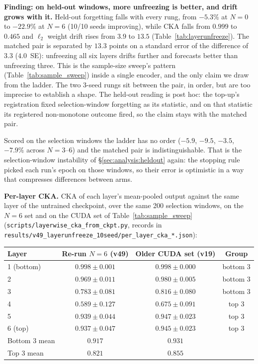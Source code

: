 

\textbf{Finding: on held-out windows, more unfreezing is better, and drift grows
with it.}  Held-out forgetting falls with every rung, from $-5.3\%$ at $N{=}0$ to
$-22.9\%$ at $N{=}6$ (10/10 seeds improving), while CKA falls from $0.999$ to
$0.465$ and $\ell_2$ weight drift rises from $3.9$ to $13.5$
(Table~\ref{tab:layerunfreeze}).  The matched pair is separated by $13.3$ points
on a standard error of the difference of $3.3$ ($4.0$~SE): unfreezing all six
layers drifts further and forecasts better than unfreezing three.  This is the
sample-size sweep's pattern (Table~\ref{tab:sample_sweep}) inside a single
encoder, and the only claim we draw from the ladder.  The two 3-seed rungs sit
between the pair, in order, but are too imprecise to establish a shape.  The
held-out reading is post hoc: the top-up's registration fixed selection-window
forgetting as its statistic, and on that statistic its registered non-monotone
outcome fired, so the claim stays with the matched pair.

Scored on the selection windows the ladder has no order ($-5.9$, $-9.5$, $-3.5$,
$-7.9\%$ across $N{=}3$--$6$) and the matched pair is indistinguishable.  That is
the selection-window instability of \S\ref{sec:analysis:heldout} again: the
stopping rule picked each run's epoch on those windows, so their error is
optimistic in a way that compresses differences between arms.

\textbf{Per-layer CKA.}  CKA of each layer's mean-pooled output against the same
layer of the untrained checkpoint, over the same 200 selection windows, on the
$N{=}6$ set and on the CUDA set of Table~\ref{tab:sample_sweep}
(\texttt{scripts/layerwise\_cka\_from\_ckpt.py}, records in
\texttt{results/v49\_layerunfreeze\_10seed/per\_layer\_cka\_*.json}):

\begin{center}
\small
\begin{tabular}{lccc}
\toprule
Layer & Re-run $N{=}6$ (v49) & Older CUDA set (v19) & Group \\
\midrule
1 (bottom) & $0.998{\pm}0.001$ & $0.998{\pm}0.000$ & bottom 3 \\
2          & $0.969{\pm}0.011$ & $0.980{\pm}0.005$ & bottom 3 \\
3          & $0.783{\pm}0.081$ & $0.816{\pm}0.080$ & bottom 3 \\
4          & $0.589{\pm}0.127$ & $0.675{\pm}0.091$ & top 3 \\
5          & $0.939{\pm}0.044$ & $0.947{\pm}0.023$ & top 3 \\
6 (top)    & $0.937{\pm}0.047$ & $0.945{\pm}0.023$ & top 3 \\
\midrule
Bottom 3 mean & $0.917$ & $0.931$ & \\
Top 3 mean    & $0.821$ & $0.855$ & \\
\bottomrule
\end{tabular}
\end{center}

